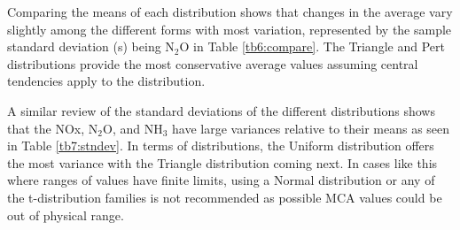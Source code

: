 %
Comparing the means of each distribution shows that changes in the average vary slightly among the different forms with most variation, represented by the sample standard deviation (s) being N$_{2}$O in Table \ref{tb6:compare}.  The Triangle and Pert distributions provide the most conservative average values assuming central tendencies apply to the distribution.
%
\begin{table}[]
\centering
\caption{Comparison of annual total emission means}
\label{tb6:compare}
\end{table}
%
A similar review of the standard deviations of the different distributions shows that the NOx, N$_{2}$O, and NH$_{3}$ have large variances relative to their means as seen in Table \ref{tb7:stndev}.  In terms of distributions, the Uniform distribution offers the most variance with the Triangle distribution coming next. In cases like this where ranges of values have finite limits, using a Normal distribution or any of the t-distribution families is not recommended as possible MCA values could be out of physical range.
